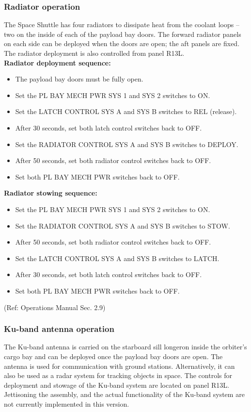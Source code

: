 \subsubsection{Radiator operation}
The Space Shuttle has four radiators to dissipate heat from the coolant loops – two on the inside of each of the payload bay doors. The forward radiator panels on each side can be deployed when the doors are open; the aft panels are fixed. The radiator deployment is also controlled from panel R13L.\\

\textbf{Radiator deployment sequence:}
\begin{itemize} 
\item The payload bay doors must be fully open.
\item Set the PL BAY MECH PWR SYS 1 and SYS 2 switches to ON.
\item Set the LATCH CONTROL SYS A and SYS B switches to REL (release).
\item After 30 seconds, set both latch control switches back to OFF.
\item Set the RADIATOR CONTROL SYS A and SYS B switches to DEPLOY.
\item After 50 seconds, set both radiator control switches back to OFF.
\item Set both PL BAY MECH PWR switches back to OFF.
\end{itemize}

\textbf{Radiator stowing sequence:}
\begin{itemize} 
\item Set the PL BAY MECH PWR SYS 1 and SYS 2 switches to ON.
\item Set the RADIATOR CONTROL SYS A and SYS B switches to STOW.
\item After 50 seconds, set both radiator control switches back to OFF.
\item Set the LATCH CONTROL SYS A and SYS B switches to LATCH.
\item After 30 seconds, set both latch control switches back to OFF.
\item Set both PL BAY MECH PWR switches back to OFF.
\end{itemize}
(Ref: Operations Manual Sec. 2.9)

\subsubsection{Ku-band antenna operation}
The Ku-band antenna is carried on the starboard sill longeron inside the orbiter’s cargo bay and can be deployed once the payload bay doors are open. The antenna is used for communication with ground stations. Alternatively, it can also be used as a radar system for tracking objects in space. The controls for deployment and stowage of the Ku-band system are located on panel R13L. Jettisoning the assembly, and the actual functionality of the Ku-band system are not currently implemented in this version.\\


